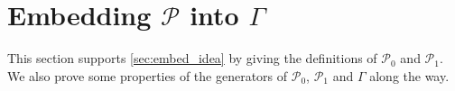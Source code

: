 \documentclass[11pt,letterpaper]{article}
\newcommand{\ket}[1]{|#1\rangle}
\newcommand{\ketbra}[2]{|#1\rangle\langle#2|}
\DeclareMathOperator{\Tr}{Tr}
\DeclareMathOperator{\supp}{supp}
\newcommand{\1}{\mathbb{1}}
\newcommand{\Pg}{\mathcal{P}}
\newcommand{\CHSH}{CHSH^{(d)}}
\newcommand{\tA}{\tilde{A}}
\newcommand{\tU}{\tilde{U}}
\theoremstyle{definition}
\begin{document}




\appendix

\section{Embedding $\Pg$ into $\Gamma$}
\label{sec:embedding}
This section supports \cref{sec:embed_idea} by giving the definitions
of $\Pg_0$ and $\Pg_1$.
We also prove some properties of the generators of $\Pg_0$, $\Pg_1$ and 
$\Gamma$ along the way.
\end{document}
